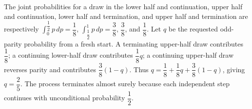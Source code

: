 The joint probabilities for a draw in the lower half and continuation, upper half and continuation, lower half and termination, and upper half and termination are respectively $\int_0^{\dfrac{1}{2}}p\,dp=\dfrac{1}{8}$, $\int_{\dfrac{1}{2}}^1p\,dp=\dfrac{3}{8}$, $\dfrac{3}{8}$, and $\dfrac{1}{8}$. Let $q$ be the requested odd-parity probability from a fresh start. A terminating upper-half draw contributes $\dfrac{1}{8}$; a continuing lower-half draw contributes $\dfrac{1}{8}q$; a continuing upper-half draw reverses parity and contributes $\dfrac{3}{8}(1-q)$. Thus $q=\dfrac{1}{8}+\dfrac{1}{8}q+\dfrac{3}{8}(1-q)$, giving $\boxed{q=\dfrac{2}{5}}$. The process terminates almost surely because each independent step continues with unconditional probability $\dfrac{1}{2}$.
